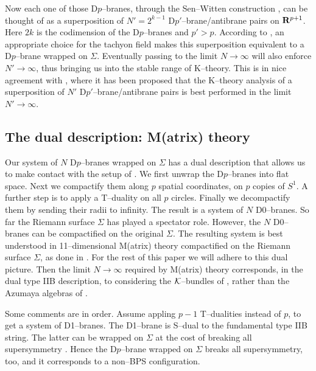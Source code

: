 \documentclass[a4paper,a4paper]{article}
\begin{document}
Now each one of those D$p$--branes, through the Sen--Witten construction 
\cite{WITTENDK, SEN}, can be thought of as a superposition of $N'=2^{k-1}$ 
D$p'$--brane/antibrane pairs on ${\bf R}^{p+1}$. Here $2k$ is the 
codimension of the D$p$--branes and $p'>p$. According 
to \cite{WITTENDK, SEN}, an appropriate choice for the tachyon field makes 
this superposition equivalent to a D$p$--brane wrapped on $\Sigma$. 
Eventually passing to the limit $N\to\infty$ will also enforce 
$N'\to\infty$, thus bringing us into the stable range of K--theory. 
This is in nice agreement with \cite{WITMICHIGAN, BOUWMATHAI}, 
where it has been proposed that the K--theory analysis of a superposition 
of $N'$ D$p'$--brane/antibrane pairs is best performed 
in the limit $N'\rightarrow\infty$.  

\subsection{The dual description: M(atrix) theory}\label{dual}  
 
Our system of $N$ D$p$--branes wrapped on $\Sigma$ has a dual description
that allows us to make contact with the setup of \cite{PROCEEDINGS}.
We first unwrap the D$p$--branes into flat space. Next we
compactify them along $p$ spatial coordinates, on $p$
copies of $S^1$. A further step is to apply a T--duality on all $p$ circles. 
Finally we decompactify them by sending their radii to infinity. 
The result is a system of $N$ D0--branes. So far the Riemann surface 
$\Sigma$ has played a spectator role. However, the  
$N$ D0--branes can be compactified on the original $\Sigma$. 
The resulting system is best understood in 11--dimensional M(atrix) 
theory compactified on the Riemann surface $\Sigma$,
as done in \cite{PROCEEDINGS}. For the rest of this paper we will
adhere to this dual picture. Then the limit 
$N\rightarrow\infty$ \cite{LANDI} required by M(atrix) theory corresponds,
in the dual type IIB description, to considering the ${\cal K}$--bundles
of \cite{BOUWMATHAI}, rather than the Azumaya algebras of \cite{KAPUSTIN}.

Some comments are in order. Assume appling $p-1$ T--dualities 
instead of $p$, to get a system of D1--branes. The D1--brane is S--dual to the  
fundamental type IIB string. The latter can be wrapped on $\Sigma$  
at the cost of breaking  all supersymmetry \cite{RUSSO}. Hence the  
D$p$--brane wrapped on $\Sigma$ breaks all supersymmetry,  too, and it  
corresponds to a non--BPS configuration.
\end{document}
